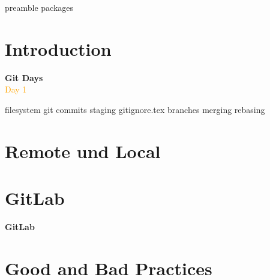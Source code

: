 \RequirePackage{import}
{preamble}
{packages}


    \section{Introduction}\label{sec:introduction}

    \begin{frame}[c]
        \centering
        \Huge
        \textbf{Git Days}
        \\
        \vspace{1ex}
        \Large
        \textcolor{orange}{Day 1}
    \end{frame}

    {filesystem}
    {git}
    {commits}
    {staging}
    {gitignore.tex}
    {branches}
    {merging}
    {rebasing}


    \section{Remote und Local}\label{sec:remote-und-local}

    \begin{frame}[c]
        \slidehead
        \center
    \end{frame}


    \section{GitLab}\label{sec:gitlab}

    \begin{frame}[c]
        \centering
        \Large
        \textbf{GitLab}
    \end{frame}


    \section{Good and Bad Practices}\label{sec:good-and-bad-practices}

